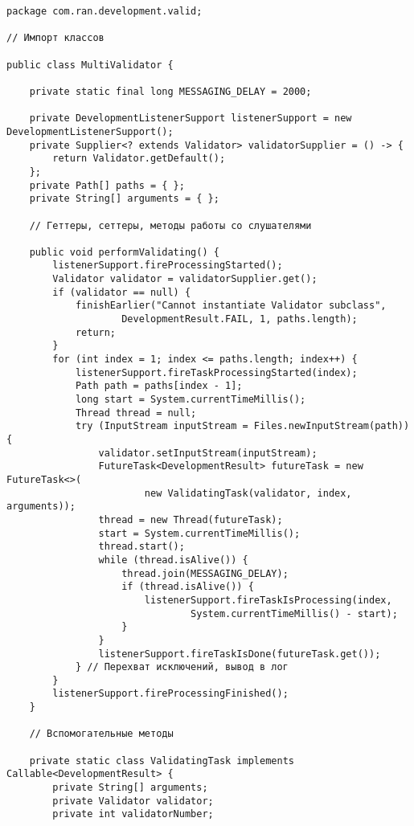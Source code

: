 \begin{verbatim}
package com.ran.development.valid;

// Импорт классов

public class MultiValidator {

    private static final long MESSAGING_DELAY = 2000;
    
    private DevelopmentListenerSupport listenerSupport = new DevelopmentListenerSupport();
    private Supplier<? extends Validator> validatorSupplier = () -> {
        return Validator.getDefault();
    };
    private Path[] paths = { };
    private String[] arguments = { };
    
    // Геттеры, сеттеры, методы работы со слушателями
    
    public void performValidating() {
        listenerSupport.fireProcessingStarted();
        Validator validator = validatorSupplier.get();
        if (validator == null) {
            finishEarlier("Cannot instantiate Validator subclass",
                    DevelopmentResult.FAIL, 1, paths.length);
            return;
        }
        for (int index = 1; index <= paths.length; index++) {
            listenerSupport.fireTaskProcessingStarted(index);
            Path path = paths[index - 1];
            long start = System.currentTimeMillis();
            Thread thread = null;
            try (InputStream inputStream = Files.newInputStream(path)) {
                validator.setInputStream(inputStream);
                FutureTask<DevelopmentResult> futureTask = new FutureTask<>(
                        new ValidatingTask(validator, index, arguments));
                thread = new Thread(futureTask);
                start = System.currentTimeMillis();
                thread.start();
                while (thread.isAlive()) {
                    thread.join(MESSAGING_DELAY);
                    if (thread.isAlive()) {
                        listenerSupport.fireTaskIsProcessing(index,
                                System.currentTimeMillis() - start);
                    }
                }
                listenerSupport.fireTaskIsDone(futureTask.get());
            } // Перехват исключений, вывод в лог
        }
        listenerSupport.fireProcessingFinished();
    }
    
    // Вспомогательные методы
    
    private static class ValidatingTask implements Callable<DevelopmentResult> {
        private String[] arguments;
        private Validator validator;
        private int validatorNumber;
        

\end{verbatim}
